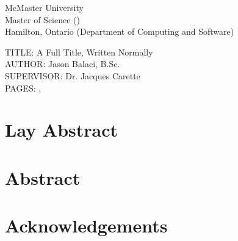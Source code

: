 \documentclass[12pt,oneside]{book}
\begin{document}
\setcounter{page}{2} %

\noindent
McMaster University \\
Master of Science (\the\year{}) \\
Hamilton, Ontario (Department of Computing and Software)

\vspace{2cm}

\noindent
TITLE: A Full Title, Written Normally \\
AUTHOR: Jason Balaci, B.Sc. \\
SUPERVISOR: Dr. Jacques Carette \\
PAGES: \pageref{lastOfFrontMatter}, \pageref{LastPage}

\newpage


\chapter*{Lay Abstract}



\chapter{Abstract}



\chapter{Acknowledgements}



\tableofcontents

\end{document}
